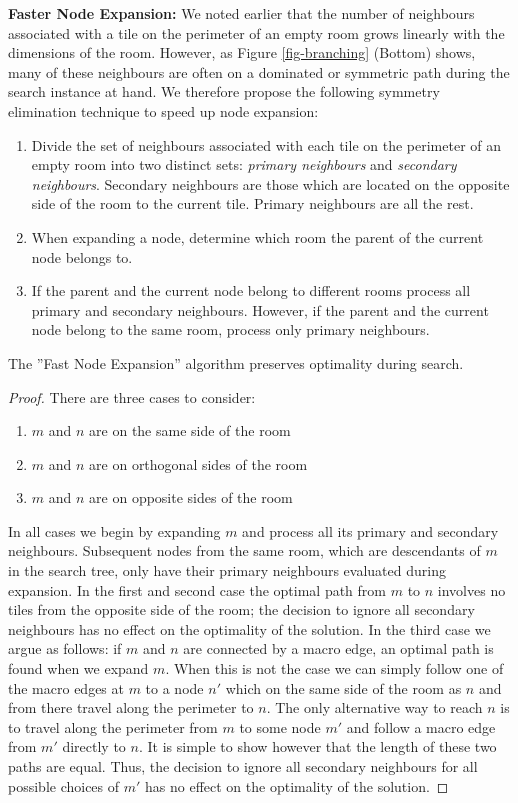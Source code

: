 \par \noindent \newline
\textbf{Faster Node Expansion:} 
We noted earlier that the number of neighbours associated with a tile on the perimeter of an empty room grows linearly
with the dimensions of the room. 
However, as Figure \ref{fig-branching} (Bottom) shows, many of these neighbours are often on a dominated or symmetric
path during the search instance at hand.
We therefore propose the following symmetry elimination technique to speed up node expansion:
\begin{enumerate}
\item{Divide the set of neighbours associated with each tile on the perimeter of an empty room into two distinct sets:
\emph{primary neighbours} and \emph{secondary neighbours}.
Secondary neighbours are those which are located on the opposite side of the room to the current tile. 
Primary neighbours are all the rest.}
\item{When expanding a node, determine which room the parent of the current node belongs to.}
\item{If the parent and the current node belong to different rooms process all primary and secondary neighbours.
However, if the parent and the current node belong to the same room, process only primary neighbours.}
\end{enumerate}

\begin{lemma}
The ''Fast Node Expansion'' algorithm preserves optimality during search.
\end{lemma}
\begin{proof}
There are three cases to consider:
\begin{enumerate}
\item{$m$ and $n$ are on the same side of the room}
\item{$m$ and $n$ are on orthogonal sides of the room}
\item{$m$ and $n$ are on opposite sides of the room}
\end{enumerate}
In all cases we begin by expanding $m$ and process all its primary and secondary neighbours.
Subsequent nodes from the same room, which are descendants of $m$ in the search tree, 
only have their primary neighbours evaluated during expansion.
In the first and second case the optimal path from $m$ to $n$ involves no tiles from the opposite side of the room;
the decision to ignore all secondary neighbours has no effect on the optimality of the solution.
In the third case we argue as follows:
if $m$ and $n$ are connected by a macro edge, an optimal path is found when we expand $m$.
When this is not the case we can simply follow one of the macro edges at $m$ to a node $n'$ which on the same side
of the room as $n$ and from there travel along the perimeter to $n$.
The only alternative way to reach $n$ is to travel along the perimeter from $m$ to some node $m'$ and follow
a macro edge from $m'$ directly to $n$. 
It is simple to show however that the length of these two paths are equal.
Thus, the decision to ignore all secondary neighbours for all possible choices of $m'$ has no effect on the optimality
of the solution.
\end{proof}



